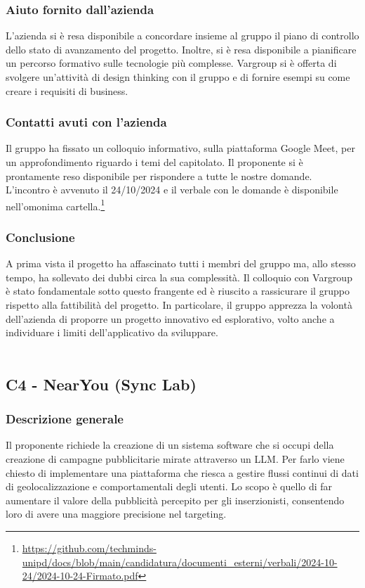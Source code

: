 \documentclass[10pt]{article}
\begin{document}
\subsubsection{Aiuto fornito dall'azienda}
L’azienda si è resa disponibile a concordare insieme al gruppo il piano di controllo dello stato di avanzamento del progetto. Inoltre, si è resa disponibile a pianificare un percorso formativo sulle tecnologie più complesse.
Vargroup si è offerta di svolgere un’attività di design thinking con il gruppo e di fornire esempi su come creare i requisiti di business.
\subsubsection{Contatti avuti con l'azienda}
Il gruppo ha fissato un colloquio informativo, sulla piattaforma Google Meet, per un approfondimento riguardo i temi del capitolato. Il proponente si è prontamente reso disponibile per rispondere a tutte le nostre domande. L'incontro è avvenuto il 24/10/2024 e il verbale con le domande è disponibile nell'omonima cartella.\footnote{\url{https://github.com/techminds-unipd/docs/blob/main/candidatura/documenti_esterni/verbali/2024-10-24/2024-10-24-Firmato.pdf}}
\subsubsection{Conclusione}
A prima vista il progetto ha affascinato tutti i membri del gruppo ma, allo stesso tempo, ha sollevato dei dubbi circa la sua complessità. Il colloquio con Vargroup è stato fondamentale sotto questo frangente ed è riuscito a rassicurare il gruppo rispetto alla fattibilità del progetto. In particolare, il gruppo apprezza la volontà dell’azienda di proporre un progetto innovativo ed esplorativo, volto anche a individuare i limiti dell’applicativo da sviluppare.
\\\\
\subsection{C4 - NearYou (Sync Lab)}
\subsubsection{Descrizione generale}
Il proponente richiede la creazione di un sistema software che si occupi della creazione di campagne pubblicitarie mirate attraverso un LLM. Per farlo viene chiesto di implementare una piattaforma che riesca a gestire flussi continui di dati di geolocalizzazione e comportamentali degli utenti. Lo scopo è quello di far aumentare il valore della pubblicità percepito per gli inserzionisti, consentendo loro di avere una maggiore precisione nel targeting.
\end{document}
